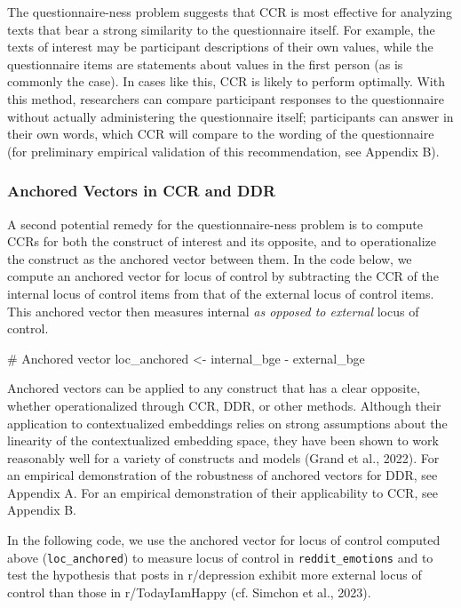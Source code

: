 \documentclass[
  man,
  floatsintext,
  longtable,
  nolmodern,
  notxfonts,
  notimes,
  colorlinks=true,linkcolor=blue,citecolor=blue,urlcolor=blue]{apa7}
\newenvironment{Shaded}{\begin{snugshade}}{\end{snugshade}}
\newcommand{\CommentTok}[1]{\textcolor[rgb]{0.37,0.37,0.37}{#1}}
\newcommand{\NormalTok}[1]{\textcolor[rgb]{0.00,0.23,0.31}{#1}}
\newcommand{\OtherTok}[1]{\textcolor[rgb]{0.00,0.23,0.31}{#1}}
\newcommand{\SpecialCharTok}[1]{\textcolor[rgb]{0.37,0.37,0.37}{#1}}
\begin{document}
The questionnaire-ness problem suggests that CCR is most effective for
analyzing texts that bear a strong similarity to the questionnaire
itself. For example, the texts of interest may be participant
descriptions of their own values, while the questionnaire items are
statements about values in the first person (as is commonly the case).
In cases like this, CCR is likely to perform optimally. With this
method, researchers can compare participant responses to the
questionnaire without actually administering the questionnaire itself;
participants can answer in their own words, which CCR will compare to
the wording of the questionnaire (for preliminary empirical validation
of this recommendation, see Appendix B).

\subsubsection{Anchored Vectors in CCR and
DDR}\label{anchored-vectors-in-ccr-and-ddr}

A second potential remedy for the questionnaire-ness problem is to
compute CCRs for both the construct of interest and its opposite, and to
operationalize the construct as the anchored vector between them. In the
code below, we compute an anchored vector for locus of control by
subtracting the CCR of the internal locus of control items from that of
the external locus of control items. This anchored vector then measures
internal \emph{as opposed to external} locus of control.

\begin{Shaded}
\begin{Highlighting}[]
\CommentTok{\# Anchored vector}
\NormalTok{loc\_anchored }\OtherTok{\textless{}{-}}\NormalTok{ internal\_bge }\SpecialCharTok{{-}}\NormalTok{ external\_bge}
\end{Highlighting}
\end{Shaded}

Anchored vectors can be applied to any construct that has a clear
opposite, whether operationalized through CCR, DDR, or other methods.
Although their application to contextualized embeddings relies on strong
assumptions about the linearity of the contextualized embedding space,
they have been shown to work reasonably well for a variety of constructs
and models (Grand et al., 2022). For an empirical demonstration of the
robustness of anchored vectors for DDR, see Appendix A. For an empirical
demonstration of their applicability to CCR, see Appendix B.

In the following code, we use the anchored vector for locus of control
computed above (\texttt{loc\_anchored}) to measure locus of control in
\texttt{reddit\_emotions} and to test the hypothesis that posts in
r/depression exhibit more external locus of control than those in
r/TodayIamHappy (cf. Simchon et al., 2023).
\end{document}
